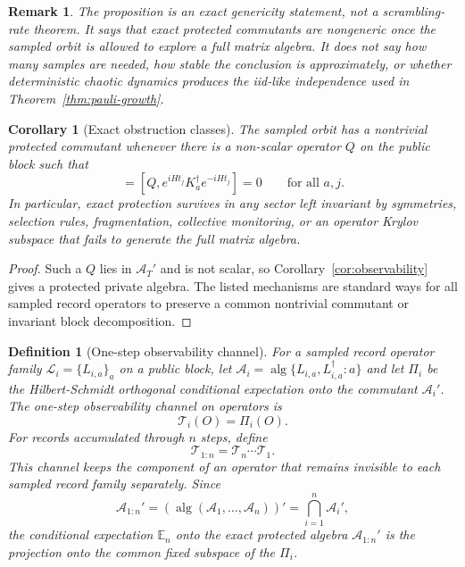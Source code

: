 \documentclass[11pt]{article}
\newtheorem{corollary}{Corollary}
\newtheorem{definition}{Definition}
\newtheorem{remark}{Remark}
\newcommand{\cA}{\mathcal A}
\newcommand{\cT}{\mathcal T}
\begin{document}
\begin{remark}
The proposition is an exact genericity statement, not a scrambling-rate
theorem.  It says that exact protected commutants are nongeneric once
the sampled orbit is allowed to explore a full matrix algebra.  It does
not say how many samples are needed, how stable the conclusion is
approximately, or whether deterministic chaotic dynamics produces the
iid-like independence used in Theorem~\ref{thm:pauli-growth}.
\end{remark}

\begin{corollary}[Exact obstruction classes]
\label{cor:obstructions}
The sampled orbit has a nontrivial protected commutant whenever there is
a non-scalar operator $Q$ on the public block such that
\begin{equation}
  [Q,e^{iHt_j}K_a e^{-iHt_j}]=
  [Q,e^{iHt_j}K_a^\dagger e^{-iHt_j}]=0
  \qquad \text{for all }a,j .
\end{equation}
In particular, exact protection survives in any sector left invariant by
symmetries, selection rules, fragmentation, collective monitoring, or an
operator Krylov subspace that fails to generate the full matrix algebra.
\end{corollary}

\begin{proof}
Such a $Q$ lies in $\cA_T'$ and is not scalar, so
Corollary~\ref{cor:observability} gives a protected private algebra.
The listed mechanisms are standard ways for all sampled record
operators to preserve a common nontrivial commutant or invariant block
decomposition.
\end{proof}

\begin{definition}[One-step observability channel]
\label{def:obs-channel}
For a sampled record operator family $\mathcal L_i=\{L_{i,a}\}_a$ on a
public block, let $\cA_i=\operatorname{alg}\{L_{i,a},L_{i,a}^\dagger:a\}$
and let $\Pi_i$ be the Hilbert-Schmidt orthogonal conditional
expectation onto the commutant $\cA_i'$.  The one-step observability
channel on operators is
\begin{equation}
  \cT_i(O)=\Pi_i(O).
\end{equation}
For records accumulated through $n$ steps, define
\begin{equation}
  \cT_{1:n}=\cT_n\cdots \cT_1 .
\end{equation}
This channel keeps the component of an operator that remains invisible
to each sampled record family separately.  Since
\begin{equation}
  \cA_{1:n}'=
  \left(\operatorname{alg}(\cA_1,\ldots,\cA_n)\right)'
  =
  \bigcap_{i=1}^n \cA_i',
\end{equation}
the conditional expectation $\mathbb E_n$ onto the exact protected
algebra $\cA_{1:n}'$ is the projection onto the common fixed subspace of
the $\Pi_i$.
\end{definition}
\end{document}
